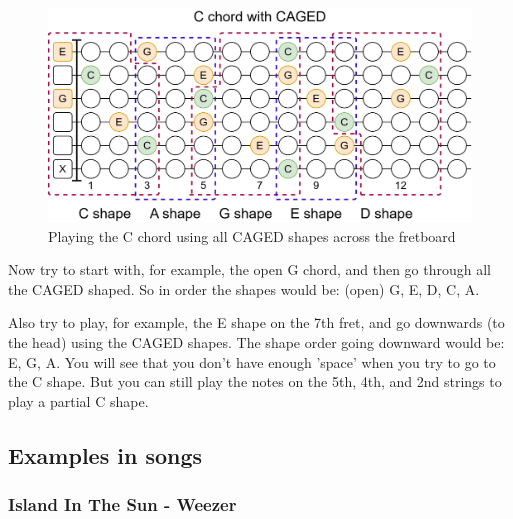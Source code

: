 \begin{figure}[h]
	\centering
	\includegraphics[width=\textwidth]{../../Images/CagedCChordOverFretboard.png}
	\caption{Playing the C chord using all CAGED shapes across the fretboard}
	\label{fig:guitar_caged_c_chord_over_fretboard}
\end{figure}


Now try to start with, for example, the open G chord, and then go through all the CAGED shaped. So in order the shapes would be: (open) G, E, D, C, A.

Also try to play, for example, the E shape on the 7th fret, and go downwards (to the head) using the CAGED shapes. The shape order going downward would be: E, G, A. You will see that you don't have enough 'space' when you try to go to the C shape. But you can still play the notes on the 5th, 4th, and 2nd strings to play a partial C shape.

\newpage

\subsection{Examples in songs}


\subsubsection{Island In The Sun - Weezer}


